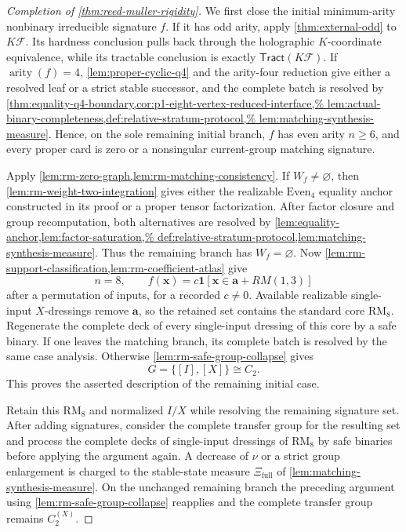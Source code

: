 \documentclass[11pt,letterpaper,onecolumn]{article}
\theoremstyle{plain}
\theoremstyle{definition}
\theoremstyle{remark}
\newcommand{\cF}{\mathcal F}
\newcommand{\Tract}{\mathsf{Tract}}
\newcommand{\CycX}[1]{{C_{#1}^{(X)}}}
\newcommand{\arity}{\operatorname{arity}}
\newcommand{\one}{\mathbf 1}
\newcommand{\RMcore}{\mathrm{RM}_8}
\begin{document}
\begin{proof}[Completion of \cref{thm:reed-muller-rigidity}]
We first close the initial minimum-arity nonbinary irreducible signature \(f\).  If it has odd arity, apply
\cref{thm:external-odd} to \(K\cF\).  Its hardness conclusion pulls back
through the holographic \(K\)-coordinate equivalence, while its tractable
conclusion is exactly \(\Tract(K\cF)\).  If
\(\arity(f)=4\), \cref{lem:proper-cyclic-q4} and the arity-four reduction
give either a resolved leaf or a strict stable successor, and the complete
batch is resolved by
\cref{thm:equality-q4-boundary,cor:p1-eight-vertex-reduced-interface,%
lem:actual-binary-completeness,def:relative-stratum-protocol,%
lem:matching-synthesis-measure}.  Hence, on the sole remaining initial
branch, \(f\) has even arity \(n\ge6\), and every proper card is zero or a
nonsingular current-group matching signature.

Apply \cref{lem:rm-zero-graph,lem:rm-matching-consistency}.  If
\(W_f\ne\varnothing\), then \cref{lem:rm-weight-two-integration} gives
either the realizable \(\mathrm{Even}_4\) equality anchor constructed in its
proof or a proper tensor factorization.  After factor closure and group
recomputation, both alternatives are resolved by
\cref{lem:equality-anchor,lem:factor-saturation,%
def:relative-stratum-protocol,lem:matching-synthesis-measure}.
Thus the remaining branch has \(W_f=\varnothing\).  Now
\cref{lem:rm-support-classification,lem:rm-coefficient-atlas} give
\[
 n=8,
 \qquad
 f({\mathbf{x}})=c\one[{\mathbf{x}}\in {\mathbf{a}}+RM(1,3)]
\]
after a permutation of inputs, for a recorded \(c\ne0\).  Available realizable
single-input \(X\)-dressings remove \({\mathbf a}\), so the retained set contains the
standard core \(\RMcore\).  Regenerate the complete deck of every
single-input dressing of this core by a safe binary.  If one leaves the matching branch,
its complete batch is resolved by the same case analysis.
Otherwise \cref{lem:rm-safe-group-collapse} gives
\[
 G=\{[I],[X]\}\cong C_2.
\]
This proves the asserted description of the remaining initial case.

Retain this \(\RMcore\) and normalized \(I/X\) while resolving the remaining signature set.  After adding signatures, consider the complete transfer group for the resulting set and process the complete decks of single-input dressings of \(\RMcore\) by safe
binaries before applying the argument again.  A decrease of \(\nu\) or a strict
group enlargement is charged to the stable-state measure \(\Xi_{\mathrm{full}}\) of
\cref{lem:matching-synthesis-measure}. On the unchanged remaining branch
the preceding argument using \cref{lem:rm-safe-group-collapse} reapplies and the complete transfer group
remains \(\CycX{2}\).


\end{proof}
\end{document}
